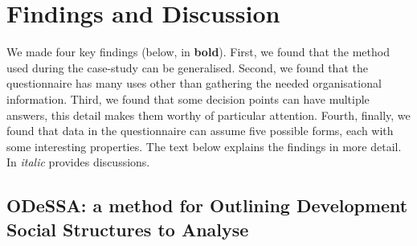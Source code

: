 \documentclass[conference]{IEEEtran}
\begin{document}
%
%


\section{Findings and Discussion}\label{res}

We made four key findings (below, in {\bf bold}). First, we found that the method used during the case-study can be generalised. Second, we found that the questionnaire has many uses other than gathering the needed organisational information. Third, we found that some decision points can have multiple answers, this detail makes them worthy of particular attention. Fourth, finally, we found that data in the questionnaire can assume five possible forms, each with some interesting properties. The text below explains the findings in more detail. In \emph{italic} provides discussions.

\subsection{ODeSSA: a method for Outlining Development Social Structures to Analyse}
%
\end{document}
